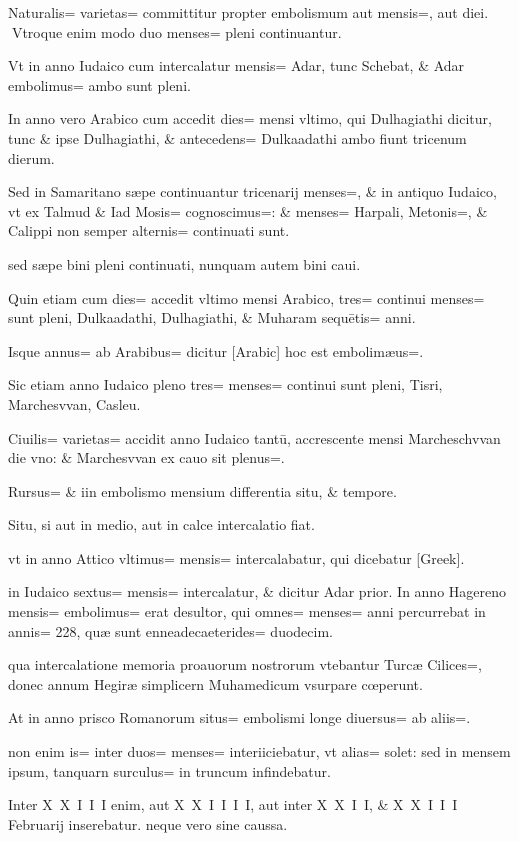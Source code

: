 \begin{parnumbers}

Naturalis= varietas= committitur propter embolismum  aut mensis=, aut diei.
Vtroque enim modo duo menses= pleni continuantur.

Vt in anno Iudaico cum intercalatur mensis= Adar, tunc Schebat, \& Adar embolimus= ambo sunt pleni.

In anno vero Arabico cum accedit dies= mensi vltimo, qui Dulhagiathi dicitur, tunc \& ipse Dulhagiathi, \& antecedens= Dulkaadathi ambo fiunt tricenum dierum.

Sed in Samaritano sæpe continuantur tricenarij menses=, \& in antiquo Iudaico, vt ex Talmud \& Iad Mosis= cognoscimus=: \& menses= Harpali, Metonis=, \& Calippi non semper alternis= continuati sunt.

sed sæpe bini pleni continuati, nunquam autem bini caui.

Quin etiam cum dies= accedit vltimo mensi Arabico, tres= continui menses= sunt pleni, Dulkaadathi, Dulhagiathi, \& Muharam sequētis= anni.

Isque annus= ab Arabibus= dicitur [Arabic] hoc est embolimæus=.

Sic etiam anno Iudaico pleno tres= menses= continui sunt pleni, Tisri, Marchesvvan, Casleu.

Ciuilis= varietas= accidit anno Iudaico tantū, accrescente mensi Marcheschvvan die vno: \& Marchesvvan ex cauo sit plenus=.

Rursus= \& iin embolismo mensium differentia situ, \& tempore.

Situ, si aut in medio, aut in calce intercalatio fiat.

vt in anno Attico vltimus= mensis= intercalabatur, qui dicebatur [Greek].

in Iudaico sextus= mensis= intercalatur, \& dicitur Adar prior. In anno Hagereno mensis= embolimus= erat desultor, qui omnes= menses= anni percurrebat in annis= 228, quæ sunt enneadecaeterides= duodecim.

qua intercalatione memoria proauorum nostrorum vtebantur Turcæ Cilices=, donec annum Hegiræ simplicern  Muhamedicum vsurpare cœperunt.

At in anno prisco Romanorum situs= embolismi longe diuersus= ab aliis=.

non enim is= inter duos= menses= interiiciebatur, vt alias= solet: sed in mensem ipsum, tanquarn surculus= in truncum infindebatur.

Inter X X I I I enim, aut X X I I I I, aut inter X X I I, \& X X I I I Februarij inserebatur. neque vero sine caussa.


\end{parnumbers}
